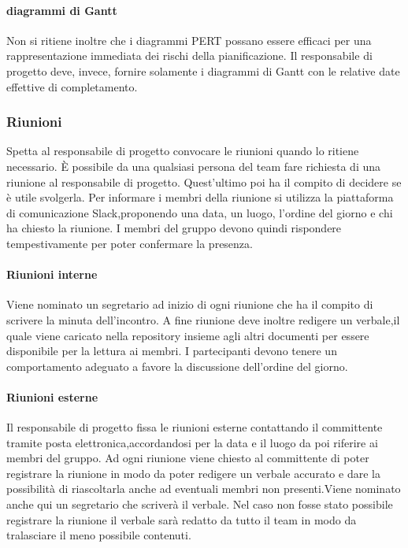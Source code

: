 \paragraph{diagrammi di Gantt} Non si ritiene inoltre che i diagrammi PERT possano essere efficaci per una rappresentazione immediata dei rischi della pianificazione. Il responsabile di progetto deve, invece, fornire solamente i diagrammi di Gantt con le relative date effettive di completamento.


\subsubsection{Riunioni}
Spetta al responsabile di progetto convocare le riunioni quando lo ritiene necessario. È possibile da una qualsiasi persona del team fare richiesta di una riunione al responsabile di progetto. Quest'ultimo poi ha il compito di decidere se è utile svolgerla. Per informare i membri della riunione si utilizza la piattaforma di comunicazione Slack,proponendo una data, un luogo, l'ordine del giorno e chi ha chiesto la riunione. I membri del gruppo devono quindi rispondere tempestivamente per poter confermare la presenza.
\paragraph{Riunioni interne} Viene nominato un segretario ad inizio di ogni riunione che ha il compito di scrivere la minuta dell'incontro. A fine riunione deve inoltre redigere un verbale,il quale viene caricato nella repository insieme agli altri documenti per essere disponibile per la lettura ai membri. I partecipanti devono tenere un comportamento adeguato a favore la discussione dell'ordine del giorno.
\paragraph{Riunioni esterne} Il responsabile di progetto fissa le riunioni esterne contattando il committente tramite posta elettronica,accordandosi per la data e il luogo da poi riferire ai membri del gruppo.
Ad ogni riunione viene chiesto al committente di poter registrare la riunione in modo da poter redigere un verbale accurato e dare la possibilità di riascoltarla anche ad eventuali membri non presenti.Viene nominato anche qui un segretario che scriverà il verbale. Nel caso non fosse stato possibile registrare la riunione il verbale sarà redatto da tutto il team in modo da tralasciare il meno possibile contenuti.
